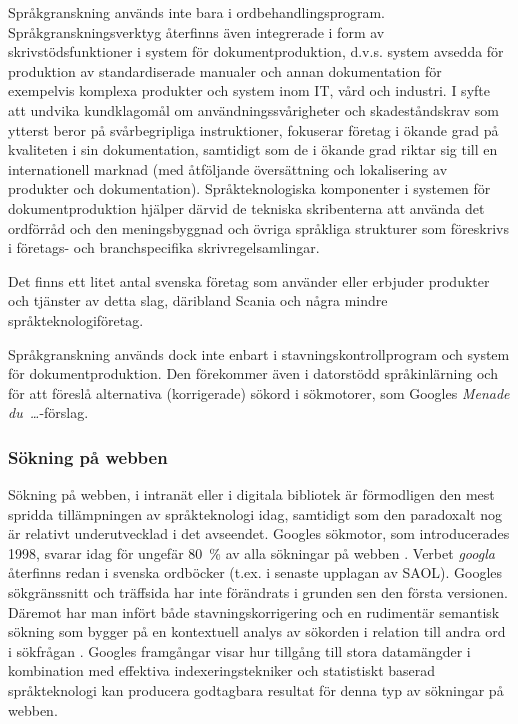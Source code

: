 \begin{multicols}{2}
Språkgranskning används inte bara i
ordbehandlingsprogram. Språkgranskningsverktyg återfinns även
integrerade i form av skrivstödsfunktioner i system för
dokumentproduktion, d.v.s. system avsedda för produktion av
standardiserade manualer och annan dokumentation för exempelvis
komplexa produkter och system inom IT, vård och industri. I syfte att
undvika kundklagomål om användningssvårigheter och skadeståndskrav som
ytterst beror på svårbegripliga instruktioner, fokuserar företag i
ökande grad på kvaliteten i sin dokumentation, samtidigt som de i
ökande grad riktar sig till en internationell marknad (med åtföljande
översättning och lokalisering av produkter och
dokumentation). Språkteknologiska komponenter i systemen för
dokumentproduktion hjälper därvid de tekniska skribenterna att använda
det ordförråd och den meningsbyggnad och övriga språkliga strukturer
som föreskrivs i företags- och branchspecifika skrivregelsamlingar.

Det finns ett litet antal svenska företag som använder eller erbjuder
produkter och tjänster av detta slag, däribland Scania och några
mindre språkteknologiföretag.

Språkgranskning används dock inte enbart i
stav\-nings\-kon\-troll\-pro\-gram och system för
dokumentproduktion. Den förekommer även i datorstödd språkinlärning
och för att föreslå alternativa (korrigerade) sökord i sökmotorer, som
Googles \textit{Menade du~\ldots}-förslag.


\subsubsection{Sökning på webben}

Sökning på webben, i intranät eller i digitala bib\-lio\-tek är
förmodligen den mest spridda tillämp\-ning\-en av språkteknologi idag,
samtidigt som den paradoxalt nog är relativt underutvecklad i det
avseendet. Googles sökmotor, som introducerades 1998, svarar idag för
ungefär 80~\% av alla sökningar på webben \cite{spi1}. Verbet
\textit{googla} återfinns redan i svenska ordböcker (t.ex. i senaste
upplagan av SAOL). Googles sökgränssnitt och träffsida har inte
förändrats i grunden sen den första versionen. Däremot har man infört
både stavningskorrigering och en rudimentär semantisk sökning som
bygger på en kontextuell analys av sökorden i relation till andra ord
i sökfrågan \cite{spi1}. Googles framgångar visar hur tillgång till
stora datamängder i kombination med effektiva
in\-dex\-er\-ings\-tek\-nik\-er och statistiskt baserad språkteknologi
kan producera godtagbara resultat för denna typ av sökningar på
webben.


\end{multicols}
